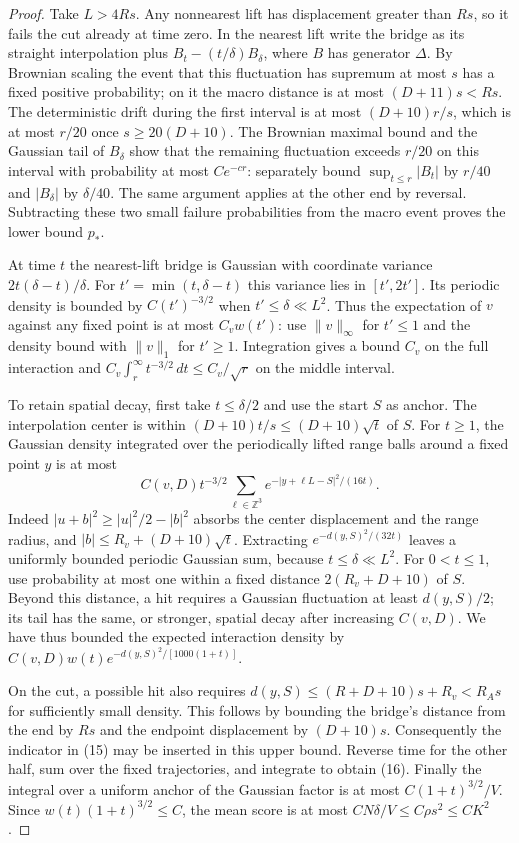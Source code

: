 \begin{proof}
Take $L>4Rs$. Any nonnearest lift has displacement greater than
$Rs$, so it fails the cut already at time zero. In the nearest
lift write the bridge as its straight interpolation plus
$B_t-(t/\delta)B_\delta$, where $B$ has generator $\Delta$.
By Brownian scaling the event that this fluctuation has supremum
at most $s$ has a fixed positive probability; on it the macro
distance is at most $(D+11)s<Rs$.
The deterministic drift during the first interval is at most
$(D+10)r/s$, which is at most $r/20$ once $s\geq20(D+10)$.
The Brownian maximal bound and the Gaussian tail of $B_\delta$
show that the remaining fluctuation exceeds $r/20$ on this
interval with probability at most $Ce^{-cr}$: separately bound
$\sup_{t\leq r}|B_t|$ by $r/40$ and
$|B_\delta|$ by $\delta/40$. The same argument applies at the
other end by reversal. Subtracting these two small failure
probabilities from the macro event proves the lower bound $p_*$.

At time $t$ the nearest-lift bridge is Gaussian with coordinate
variance $2t(\delta-t)/\delta$. For
$t'=\min(t,\delta-t)$ this variance lies in $[t',2t']$.
Its periodic density is bounded by $C(t')^{-3/2}$ when
$t'\leq\delta\ll L^2$. Thus the expectation of $v$ against any
fixed point is at most $C_vw(t')$: use $\|v\|_\infty$ for
$t'\leq1$ and the density bound with $\|v\|_1$ for $t'\geq1$.
Integration gives a bound $C_v$ on the full interaction and
$C_v\int_r^\infty t^{-3/2}\,dt\leq C_v/\sqrt r$ on the
middle interval.

To retain spatial decay, first take $t\leq\delta/2$ and use
the start $S$ as anchor. The interpolation center is within
$(D+10)t/s\leq(D+10)\sqrt t$ of $S$.
For $t\geq1$, the Gaussian density integrated over the periodically
lifted range balls around a fixed point $y$ is at most
\[
 C(v,D)t^{-3/2}\sum_{\ell\in\mathbb Z^3}
 e^{-|y+\ell L-S|^2/(16t)}.
\]
Indeed $|u+b|^2\geq|u|^2/2-|b|^2$ absorbs the center displacement
and the range radius, and $|b|\leq R_v+(D+10)\sqrt t$.
Extracting $e^{-d(y,S)^2/(32t)}$ leaves a uniformly bounded
periodic Gaussian sum, because $t\leq\delta\ll L^2$.
For $0<t\leq1$, use probability at most one within a fixed
distance $2(R_v+D+10)$ of $S$. Beyond this distance, a hit
requires a Gaussian fluctuation at least $d(y,S)/2$; its tail
has the same, or stronger, spatial decay after increasing
$C(v,D)$. We have thus bounded the expected interaction density
by
$C(v,D)w(t)e^{-d(y,S)^2/[1000(1+t)]}$.

On the cut, a possible hit also requires
$d(y,S)\leq (R+D+10)s+R_v<R_As$ for sufficiently small density.
This follows by bounding the bridge's distance from the end by
$Rs$ and the endpoint displacement by $(D+10)s$.
Consequently the indicator in (15) may be inserted in this upper
bound. Reverse time for the other half, sum over the fixed
trajectories, and integrate to obtain (16).
Finally the integral over a uniform anchor of the Gaussian factor
is at most $C(1+t)^{3/2}/V$. Since
$w(t)(1+t)^{3/2}\leq C$, the mean score is at most
$CN\delta/V\leq C\rho s^2\leq CK^2$.
\end{proof}
